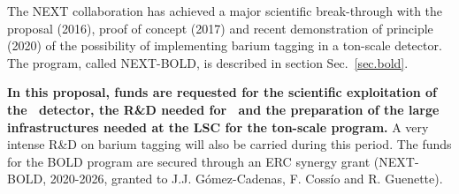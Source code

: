 The NEXT collaboration has achieved a major scientific break-through with the proposal (2016), proof of concept (2017) and recent demonstration of principle (2020) of the possibility of implementing barium tagging in a ton-scale detector. The program, called NEXT-BOLD, is described in section Sec.~\ref{sec.bold}.

{\bf In this proposal, funds are requested for the scientific exploitation of the \Next\ detector, the R\&D needed for \NHD\ and the preparation of the large infrastructures needed at the LSC for the ton-scale program.} A very intense R\&D on barium tagging will also be carried during this period. The funds for the BOLD program are secured through an ERC synergy grant (NEXT-BOLD, 2020-2026, granted to J.J. G\'omez-Cadenas, F. Coss\'io and R. Guenette). 
